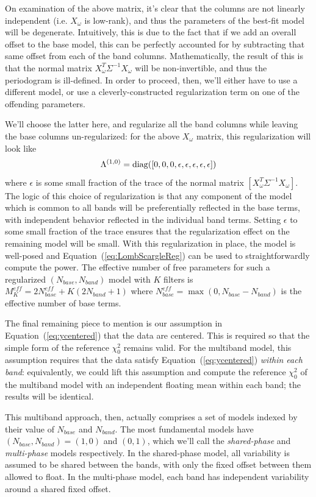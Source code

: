 \documentclass[12pt,preprint]{aastex}
\newcommand{\Eq}[1]{Equation~(\ref{eq:#1})}
\newcommand{\eq}[1]{\Eq{#1}}
\begin{document}
On examination of the above matrix, it's clear that the columns are not linearly independent (i.e. $X_\omega$ is low-rank), and thus the parameters of the best-fit model will be degenerate. Intuitively, this is due to the fact that if we add an overall offset to the base model, this can be perfectly accounted for by subtracting that same offset from each of the band columns. Mathematically, the result of this is that the normal matrix $X_\omega^T\Sigma^{-1}X_\omega$ will be non-invertible, and thus the periodogram is ill-defined. In order to proceed, then, we'll either have to use a different model, or use a cleverly-constructed regularization term on one of the offending parameters.

We'll choose the latter here, and regularize all the band columns while leaving the base columns un-regularized: for the above $X_\omega$ matrix, this regularization will look like
\begin{equation}
  \Lambda^{(1,0)} = {\rm diag}([0, 0, 0, \epsilon, \epsilon, \epsilon, \epsilon, \epsilon])
\end{equation}
where $\epsilon$ is some small fraction of the trace of the normal matrix $[X_\omega^T\Sigma^{-1}X_\omega]$. The logic of this choice of regularization is that any component of the model which is common to all bands will be preferentially reflected in the base terms, with independent behavior reflected in the individual band terms. Setting $\epsilon$ to some small fraction of the trace ensures that the regularization effect on the remaining model will be small. With this regularization in place, the model is well-posed and \eq{LombScargleReg} can be used to straightforwardly compute the power. The effective number of free parameters for such a regularized $(N_{base}, N_{band})$ model with $K$ filters is
$M_K^{eff} = 2N_{base}^{eff} + K(2N_{band} + 1)$ where $N_{base}^{eff} = \max(0, N_{base} - N_{band})$ is the effective number of base terms.

The final remaining piece to mention is our assumption in \eq{ycentered} that the data are centered. This is required so that the simple form of the reference $\chi^2_0$ remains valid. For the multiband model, this assumption requires that the data satisfy \eq{ycentered} {\it within each band}: equivalently, we could lift this assumption and compute the reference $\chi^2_0$ of the multiband model with an independent floating mean within each band; the results will be identical.

This multiband approach, then, actually comprises a set of models indexed by their value of $N_{base}$ and $N_{band}$. The most fundamental models have $(N_{base}, N_{band}) = (1,0)$ and $(0,1)$, which we'll call the {\it shared-phase} and {\it multi-phase} models respectively. In the shared-phase model, all variability is assumed to be shared between the bands, with only the fixed offset between them allowed to float. In the multi-phase model, each band has independent variability around a shared fixed offset.
\end{document}
